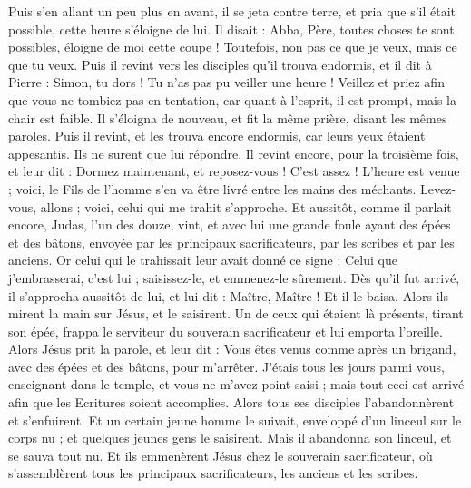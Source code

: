 \begin{multicols}{2}
Puis s'en allant un peu plus en avant, il se jeta contre terre, et pria que s'il était possible, cette heure s'éloigne de lui.
Il disait : Abba, Père, toutes choses te sont possibles, éloigne de moi cette coupe ! Toutefois, non pas ce que je veux, mais ce que tu veux.
Puis il revint vers les disciples qu'il trouva endormis, et il dit à Pierre : Simon, tu dors ! Tu n'as pas pu veiller une heure !
Veillez et priez afin que vous ne tombiez pas en tentation, car quant à l'esprit, il est prompt, mais la chair est faible.
Il s'éloigna de nouveau, et fit la même prière, disant les mêmes paroles.
Puis il revint, et les trouva encore endormis, car leurs yeux étaient appesantis. Ils ne surent que lui répondre.
Il revint encore, pour la troisième fois, et leur dit : Dormez maintenant, et reposez-vous ! C'est assez ! L'heure est venue ; voici, le Fils de l'homme s'en va être livré entre les mains des méchants.
Levez-vous, allons ; voici, celui qui me trahit s'approche.
Et aussitôt, comme il parlait encore, Judas, l'un des douze, vint, et avec lui une grande foule ayant des épées et des bâtons, envoyée par les principaux sacrificateurs, par les scribes et par les anciens.
Or celui qui le trahissait leur avait donné ce signe : Celui que j'embrasserai, c'est lui ; saisissez-le, et emmenez-le sûrement.
Dès qu'il fut arrivé, il s'approcha aussitôt de lui, et lui dit : Maître, Maître ! Et il le baisa.
Alors ils mirent la main sur Jésus, et le saisirent.
Un de ceux qui étaient là présents, tirant son épée, frappa le serviteur du souverain sacrificateur et lui emporta l'oreille.
Alors Jésus prit la parole, et leur dit : Vous êtes venus comme après un brigand, avec des épées et des bâtons, pour m'arrêter.
J'étais tous les jours parmi vous, enseignant dans le temple, et vous ne m'avez point saisi ; mais tout ceci est arrivé afin que les Ecritures soient accomplies.
Alors tous ses disciples l'abandonnèrent et s'enfuirent.
Et un certain jeune homme le suivait, enveloppé d'un linceul sur le corps nu ; et quelques jeunes gens le saisirent.
Mais il abandonna son linceul, et se sauva tout nu.
Et ils emmenèrent Jésus chez le souverain sacrificateur, où s'assemblèrent tous les principaux sacrificateurs, les anciens et les scribes.

\end{multicols}
